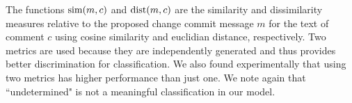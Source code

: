 The functions $\operatorname{sim}(m,c)$ and $\operatorname{dist}(m,c)$ are the similarity and dissimilarity measures relative to the proposed change commit message $m$ for the text of comment $c$ using cosine similarity and euclidian distance, respectively.
Two metrics are used because they are independently generated and thus provides better discrimination for classification.
We also found experimentally that using two metrics has higher performance than just one. We note again that ``undetermined" is not a meaningful classification in our model.


%
%
%
%
